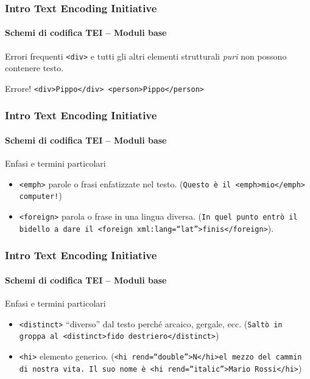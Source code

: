 \begin{frame}
	\frametitle{Intro Text Encoding Initiative}
	\framesubtitle{Schemi di codifica TEI – Moduli base}
	\addtocounter{nframe}{1}

    \begin{block}{Errori frequenti}
        \texttt{<div>} e tutti gli altri elementi strutturali \textit{puri} non
        possono contenere testo.
       
    \end{block}
    
    \begin{block}{Errore!}
        \texttt{<div>Pippo</div>
        <person>Pippo</person>}
    \end{block}
    

\end{frame}



\begin{frame}
	\frametitle{Intro Text Encoding Initiative}
	\framesubtitle{Schemi di codifica TEI – Moduli base}
	\addtocounter{nframe}{1}

	\begin{block}{Enfasi e termini particolari}
       
        \begin{itemize}
            \item \texttt{<emph>} parole o frasi enfatizzate nel testo. (\texttt{Questo è il <emph>mio</emph> computer!})
            \item \texttt{<foreign>} parola o frase in una lingua diversa. (\texttt{In quel punto entrò il bidello a dare il <foreign xml:lang=``lat''>finis</foreign>}).
        \end{itemize}
    \end{block}

\end{frame}

\begin{frame}
	\frametitle{Intro Text Encoding Initiative}
	\framesubtitle{Schemi di codifica TEI – Moduli base}
	\addtocounter{nframe}{1}

	\begin{block}{Enfasi e termini particolari}
       
        \begin{itemize}
            \item \texttt{<distinct>} “diverso” dal testo perché arcaico, gergale, ecc. (\texttt{Saltò in groppa al <distinct>fido destriero</distinct>})
            \item \texttt{<hi>} elemento generico. (\texttt{<hi rend=``double''>N</hi>el mezzo del cammin di nostra vita.
            Il suo nome è <hi rend=``italic''>Mario Rossi</hi>})
        \end{itemize}
    \end{block}

\end{frame}

